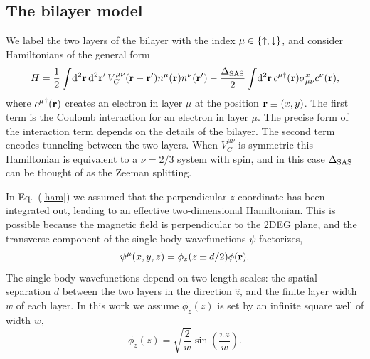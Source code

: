 \subsection{The bilayer model}
We label the two layers of the bilayer with the index $\mu \in \{\uparrow,\downarrow\}$, and consider  Hamiltonians of the general form
\begin{equation}
	H=\frac{1}{2} \int\! \mathrm{d}^2{\mathbf{r}}\, \mathrm{d}^2{\mathbf{r}}^\prime\, V_C^{\mu\nu}({\mathbf{r}}-{\mathbf{r}}^\prime) n^{\mu}({\mathbf{r}})n^{\nu}({\mathbf{r}}^\prime) 
	- \frac{\Delta_\textrm{SAS}}{2} \int\! \mathrm{d}^2{\mathbf{r}}\, c^{\mu\dagger}({\mathbf{r}}) \sigma^x_{\mu \nu} c^{\nu}({\mathbf{r}}), 
	\label{ham}
\end{equation}
where ${c^{\mu}}^\dagger ({\mathbf{r}})$ creates an electron in layer $\mu$ at the position ${\mathbf{r}}\equiv(x,y)$. The first term is the Coulomb interaction
for an electron in layer $\mu$. The precise form of the interaction term depends on the details of the bilayer. The second term encodes tunneling between the two layers.
When $V_C^{\mu\nu}$ is  symmetric this Hamiltonian is equivalent to a $\nu=2/3$ system with spin, and in this case $\Delta_\textrm{SAS}$ can be thought of as the Zeeman splitting.


In Eq.~(\ref{ham}) we assumed that the perpendicular $z$ coordinate has been integrated out, leading to an effective two-dimensional Hamiltonian.
This is possible because the magnetic field is perpendicular to the 2DEG plane, and the transverse component of the single body wavefunctions $\psi$ factorizes,
\begin{equation}
\psi^\mu(x,y,z)=\phi_z(z \pm d / 2)  \phi({\mathbf{r}}).
\end{equation}
The single-body wavefunctions depend on two length scales: the spatial separation $d$ between the two layers in the direction $\hat{z}$, and the finite layer width $w$ of each layer. In this work we assume $\phi_z(z)$ is set by an infinite square well of width $w$, 
\begin{equation}
\phi_z(z)=\sqrt{\frac{2}{w}} \sin\left(\frac{\pi z}{w}\right). 
\end{equation}
 
